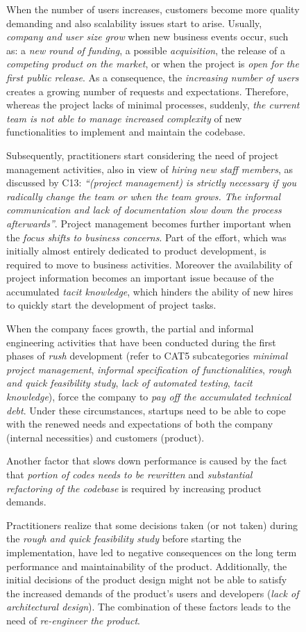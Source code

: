 \documentclass[12pt,journal,compsoc]{../sty/IEEEtran}
\begin{document}
\begin{table}[!t]
\begin{figure}[!t]
\begin{compactitem}
When the number of users increases, customers become more quality demanding and
also scalability issues start to arise. Usually, \textit{company and user size
grow} when new business events occur, such as: a \textit{new round of funding},
a possible \textit{acquisition}, the release of a \textit{competing product on
the market}, or when the project is \textit{open for the first public release}.
As a consequence, the \textit{increasing number of users} creates a growing
number of requests and expectations. Therefore, whereas the project lacks of
minimal processes, suddenly, \textit{the current team is not able to manage
increased complexity} of new functionalities to implement and maintain the
codebase.

Subsequently, practitioners start considering the need of project management
activities, also in view of \textit{hiring new staff members}, as discussed by
C13: \textit{``(project management) is strictly necessary if you radically
change the team or when the team grows.  The informal communication and lack of
documentation slow down the process afterwards''}.  Project management becomes
further important when the \textit{focus shifts to business concerns}. Part of
the effort, which was initially almost entirely dedicated to product
development, is required to move to business activities. Moreover the
availability of project information becomes an important issue because of the
accumulated \textit{tacit knowledge}, which hinders the ability of new hires to
quickly start the development of project tasks.

When the company faces growth, the partial and informal engineering activities
that have been conducted during the first phases of \textit{rush} development
(refer to CAT5 subcategories \textit{minimal project management},
\textit{informal specification of functionalities}, \textit{rough and quick
feasibility study}, \textit{lack of automated testing}, \textit{tacit
knowledge}), force the company to \textit{pay off the accumulated technical
debt}. Under these circumstances, startups need to be able to cope with the
renewed needs and expectations of both the company (internal necessities) and
customers (product).

Another factor that slows down performance is caused by the fact that
\textit{portion of codes needs to be rewritten} and \textit{substantial
refactoring of the codebase} is required by increasing product demands.

Practitioners realize that some decisions taken (or not taken) during the
\textit{rough and quick feasibility study} before starting the implementation,
have led to negative consequences on the long term performance and
maintainability of the product. Additionally, the initial decisions of the
product design might not be able to satisfy the increased demands of the
product's users and developers (\textit{lack of architectural design}). The
combination of these factors leads to the need of \textit{re-engineer the
product}.


\end{compactitem}
\end{figure}
\end{table}
\end{document}
